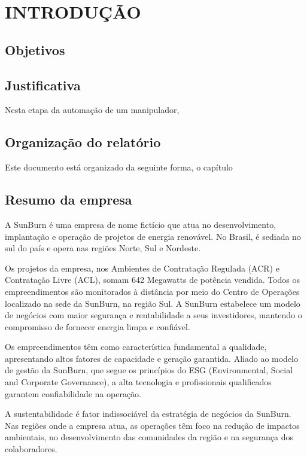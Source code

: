 \chapter{INTRODUÇÃO}
\label{chap:intro}

\section{Objetivos}
\label{sec:obj}


\section{Justificativa} %
\label{sec:just}
Nesta etapa da automação de um manipulador, 


\section{Organização do relatório}
\label{sec:org}
Este documento está organizado da seguinte forma, o capítulo 

\section{Resumo da empresa}
\label{sec:rese}
A SunBurn é uma empresa de nome fictício que atua no desenvolvimento, implantação e operação de projetos de energia renovável. No Brasil, é sediada no sul do país e opera nas regiões Norte, Sul e Nordeste.

Os projetos da empresa, nos Ambientes de Contratação Regulada (ACR) e Contratação Livre (ACL), somam 642 Megawatts de potência vendida. Todos os empreendimentos são monitorados à distância por meio do Centro de Operações localizado na sede da SunBurn, na região Sul.
A SunBurn estabelece um modelo de negócios com maior segurança e rentabilidade a seus investidores, mantendo o compromisso de fornecer energia limpa e confiável.

Os empreendimentos têm como característica fundamental a qualidade, apresentando altos fatores de capacidade e geração garantida. Aliado ao modelo de gestão da SunBurn, que segue os princípios do ESG (Environmental, Social and Corporate Governance), a alta tecnologia e profissionais qualificados garantem confiabilidade na operação.

A sustentabilidade é fator indissociável da estratégia de negócios da SunBurn. Nas regiões onde a empresa atua, as operações têm foco na redução de impactos ambientais, no desenvolvimento das comunidades da região e na segurança dos colaboradores.